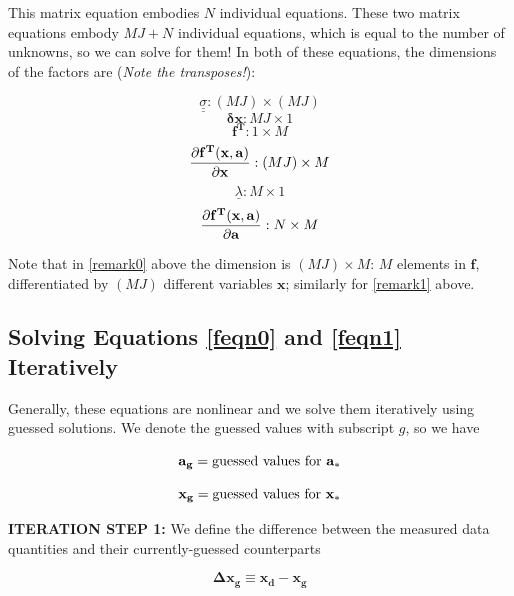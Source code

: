 \documentclass[psfig,preprint]{aastex}
\begin{document}
\noindent This matrix equation embodies $N$ individual equations. These
two matrix equations embody $MJ + N$ individual equations, which is
equal to the number of unknowns, so we can solve for them! In both of
these equations, the dimensions of the factors are ({\it Note the
transposes!}):

\begin{mathletters}
\begin{equation}
\underline{\underline{\sigma}} : (MJ) \times (MJ) 
\end{equation}
\begin{equation}
\mathbf{\delta x} : MJ \times 1 
\end{equation}
\begin{equation}
\mathbf{f^T} : 1 \times M 
\end{equation}
\begin{equation} \label{remark0}
\mathbf{ {\partial f^T(x, a) \over \partial x} } : (MJ) \times M 
\end{equation}
\begin{equation}
\underline{\lambda}: M \times 1 
\end{equation}
\begin{equation} \label{remark1}
\mathbf{ {\partial f^T(x, a) \over \partial a} } : N \times M
\end{equation}
\end{mathletters}

\noindent Note that in \ref{remark0} above the dimension is $(MJ) \times M$: $M$ 
elements in $\mathbf f$, differentiated by $(MJ)$ different variables
$\mathbf x$; similarly for \ref{remark1} above.

\subsection{ Solving Equations \ref{feqn0} and \ref {feqn1} Iteratively}

Generally, these equations are nonlinear and we solve them iteratively using
guessed solutions. We denote the guessed values with subscript $g$, so
we have 

\begin{mathletters} \label{iteration}
\begin{equation}
\mathbf{ a_g} = {\rm guessed \ values \ for} \ \mathbf{a_*}
\end{equation}

\begin{equation}
\mathbf{ x_g} = {\rm guessed \ values \ for} \ \mathbf{x_*}
\end{equation}

{\large \bf ITERATION STEP 1:} We define the difference
between the measured data quantities and their currently-guessed
counterparts

\begin{equation}
\mathbf{ \Delta x_g \equiv x_d - x_g}
\end{equation}
\end{mathletters}
\end{document}
